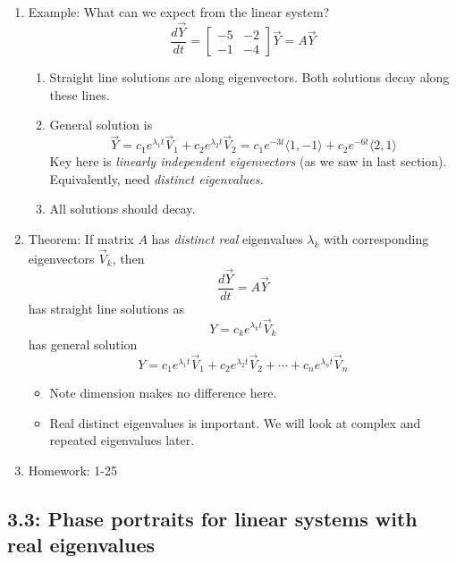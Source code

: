 \documentclass{article}
\begin{document}
\begin{enumerate}
\item Example: What can we expect from the linear system?
\[
\frac{d\vec{Y}}{dt} =
\begin{bmatrix}
-5 & -2 \\
-1 & -4
\end{bmatrix} \vec{Y}
= A\vec{Y}
\]
\begin{enumerate}
\item Straight line solutions are along eigenvectors. Both solutions decay along these lines. 
\item General solution is 
\[
\vec{Y} = c_1 e^{\lambda_1 t} \vec{V}_1 + c_2 e^{\lambda_2 t} \vec{V}_2
 = c_1 e^{-3 t} \langle 1,-1 \rangle + c_2 e^{-6 t} \langle 2,1 \rangle
\]
Key here is \emph{linearly independent eigenvectors} (as we saw in last section). Equivalently, need \emph{distinct eigenvalues.}
\item All solutions should decay.
\end{enumerate}

\item Theorem: If matrix $A$ has \emph{distinct real} eigenvalues $\lambda_k$ with corresponding eigenvectors $\vec{V}_k$, then  
\[
\frac{d\vec{Y}}{dt} = A\vec{Y}
\]
has straight line solutions as
\[
Y = c_k e^{\lambda_k t} \vec{V}_k
\]
has general solution 
\[
Y = c_1 e^{\lambda_1 t} \vec{V}_1 + c_2 e^{\lambda_2 t} \vec{V}_2 + \cdots + c_n e^{\lambda_n t} \vec{V}_n 
\] 
\begin{itemize}
\item Note dimension makes no difference here. 
\item Real distinct eigenvalues is important. We will look at complex and repeated eigenvalues later.
\end{itemize}


\item Homework: 1-25

\end{enumerate}

\subsection{3.3: Phase portraits for linear systems with real eigenvalues}
\end{document}
